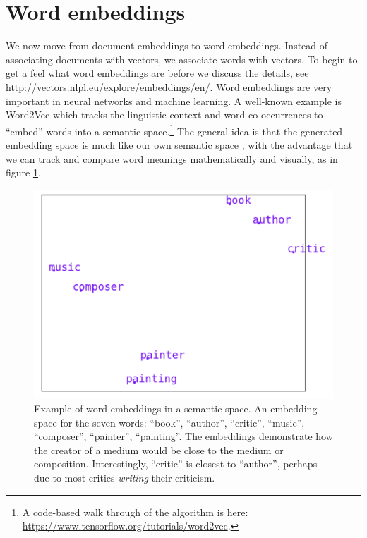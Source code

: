 \section{Word embeddings}

We now move from document embeddings to word embeddings.  Instead of associating documents with vectors, we associate words with vectors. To begin to get a feel what word embeddings are before we discuss the details, see \url{http://vectors.nlpl.eu/explore/embeddings/en/}. Word embeddings are very important in neural networks and machine learning. A well-known example is Word2Vec \cite{mikolov2013distributed} which tracks the linguistic context and word co-occurrences to ``embed'' words into a semantic space.\footnote{A code-based walk through of the algorithm is here:  \url{https://www.tensorflow.org/tutorials/word2vec}.} The general idea is that the generated embedding space is much like our own semantic space \cite{lewis2019distributional}, with the advantage that we can track and compare word meanings mathematically and visually, as in figure \ref{f:writerPainterExample}. 

\begin{figure}[h]
    \centering
    \includegraphics[scale=.5]{./images/Word_vector_demo.png}
    \caption[Generated using \url{http://vectors.nlpl.eu/explore/embeddings/en/}.]{Example of word embeddings in a semantic space. An embedding space for the seven words: ``book'', ``author'', ``critic'', ``music'', ``composer'', ``painter'', ``painting''. The embeddings demonstrate how the creator of a medium would be close to the medium or composition. Interestingly, ``critic'' is closest to ``author'', perhaps due to most critics \textit{writing} their criticism.}
 \label{f:writerPainterExample}
\end{figure}

